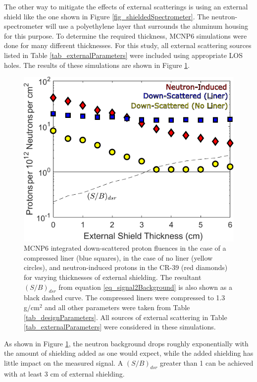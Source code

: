 The other way to mitigate the effects of external scatterings is using an external shield like the one shown in Figure \ref{fig_shieldedSpectrometer}. The neutron-spectrometer will use a polyethylene layer that surrounds the aluminum housing for this purpose. To determine the required thickness, MCNP6 simulations were done for many different thicknesses. For this study, all external scattering sources listed in Table \ref{tab_externalParameters} were included using appropriate LOS holes. The results of these simulations are shown in Figure \ref{fig_externalShielding}.

\begin{figure}[h!]
	
	\centering
	\includegraphics[scale=1.5]{Figures/S2B_ExternalShield.pdf}
	\caption{MCNP6 integrated down-scattered proton fluences in the case of a compressed liner (blue squares), in the case of no liner (yellow circles), and neutron-induced protons in the CR-39 (red diamonds) for varying thicknesses of external shielding. The resultant $(S/B)_{dsr}$ from equation \ref{eq_signal2Background} is also shown as a black dashed curve. The compressed liners were compressed to 1.3 g/cm$^2$ and all other parameters were taken from Table \ref{tab_designParameters}. All sources of external scattering in Table \ref{tab_externalParameters} were considered in these simulations.}
	\label{fig_externalShielding}
	
\end{figure}

As shown in Figure \ref{fig_externalShielding}, the neutron background drops roughly exponentially with the amount of shielding added as one would expect, while the added shielding has little impact on the measured signal. A $(S/B)_{dsr}$ greater than 1 can be achieved with at least 3 cm of external shielding.

